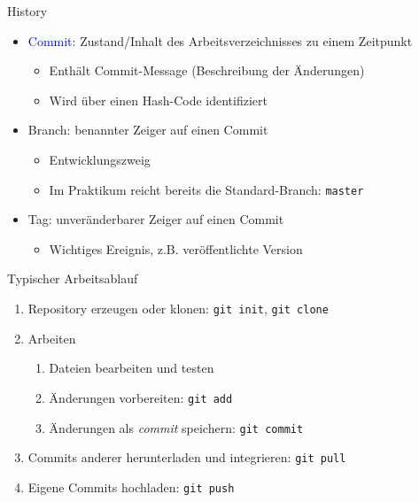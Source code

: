 \begin{frame}{History}

  \vspace{1em}
  \begin{itemize}
    \item \textcolor{blue}{Commit}: Zustand/Inhalt des Arbeitsverzeichnisses zu einem Zeitpunkt
      \begin{itemize}
        \item Enthält Commit-Message (Beschreibung der Änderungen)
        \item Wird über einen Hash-Code identifiziert
      \end{itemize}
    \item \textcolor{vertexDarkRed}{Branch}: benannter Zeiger auf einen Commit
      \begin{itemize}
        \item Entwicklungszweig
        \item Im Praktikum reicht bereits die Standard-Branch: \texttt{master}
      \end{itemize}
    \item \textcolor{green!60!black}{Tag}: unveränderbarer Zeiger auf einen Commit
      \begin{itemize}
        \item Wichtiges Ereignis, z.B. veröffentlichte Version
      \end{itemize}
  \end{itemize}
\end{frame}

\begin{frame}{Typischer Arbeitsablauf}
  \begin{enumerate}
    \item Repository erzeugen oder klonen: \texttt{git init}, \texttt{git clone}
    \item Arbeiten
      \begin{enumerate}
        \item Dateien bearbeiten und testen
        \item Änderungen vorbereiten: \texttt{git add}
        \item Änderungen als \emph{commit} speichern: \texttt{git commit}
      \end{enumerate}
    \item Commits anderer herunterladen und integrieren: \texttt{git pull}
    \item Eigene Commits hochladen: \texttt{git push}
  \end{enumerate}
\end{frame}

